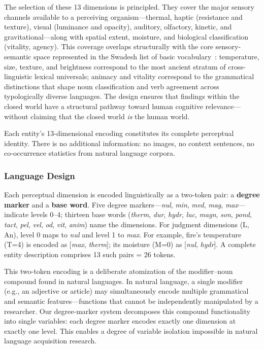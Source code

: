 \documentclass{article}
\begin{document}
The selection of these 13 dimensions is principled. They cover the major sensory channels available to a perceiving organism---thermal, haptic (resistance and texture), visual (luminance and opacity), auditory, olfactory, kinetic, and gravitational---along with spatial extent, moisture, and biological classification (vitality, agency). This coverage overlaps structurally with the core sensory-semantic space represented in the Swadesh list of basic vocabulary~\cite{swadesh1955}: temperature, size, texture, and brightness correspond to the most ancient stratum of cross-linguistic lexical universals; animacy and vitality correspond to the grammatical distinctions that shape noun classification and verb agreement across typologically diverse languages. The design ensures that findings within the closed world have a structural pathway toward human cognitive relevance---without claiming that the closed world \emph{is} the human world.

Each entity's 13-dimensional encoding constitutes its complete perceptual identity. There is no additional information: no images, no context sentences, no co-occurrence statistics from natural language corpora.

\subsubsection{Language Design}

Each perceptual dimension is encoded linguistically as a two-token pair: a \textbf{degree marker} and a \textbf{base word}. Five degree markers---\textit{nul}, \textit{min}, \textit{med}, \textit{mag}, \textit{max}---indicate levels 0--4; thirteen base words (\textit{therm}, \textit{dur}, \textit{hydr}, \textit{luc}, \textit{magn}, \textit{son}, \textit{pond}, \textit{tact}, \textit{pel}, \textit{vel}, \textit{od}, \textit{vit}, \textit{anim}) name the dimensions. For judgment dimensions (L, An), level 0 maps to \textit{nul} and level 1 to \textit{max}. For example, fire's temperature (T=4) is encoded as [\textit{max}, \textit{therm}]; its moisture (M=0) as [\textit{nul}, \textit{hydr}]. A complete entity description comprises 13 such pairs = 26 tokens.

This two-token encoding is a deliberate atomization of the modifier--noun compound found in natural languages. In natural language, a single modifier (e.g., an adjective or article) may simultaneously encode multiple grammatical and semantic features---functions that cannot be independently manipulated by a researcher. Our degree-marker system decomposes this compound functionality into single variables: each degree marker encodes exactly one dimension at exactly one level. This enables a degree of variable isolation impossible in natural language acquisition research.
\end{document}
